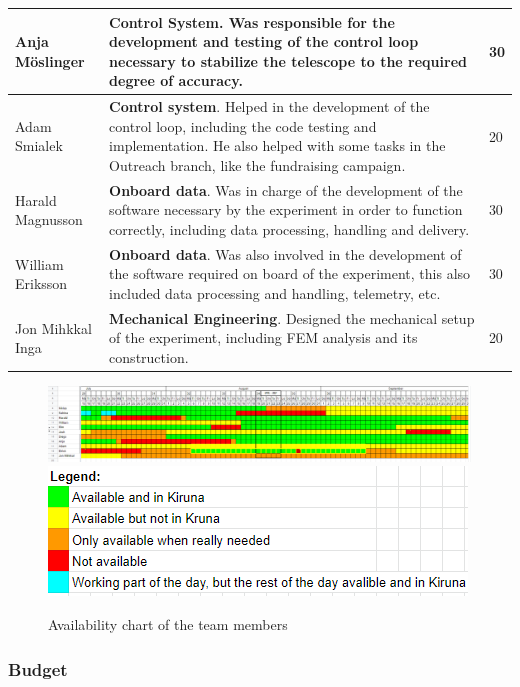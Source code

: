 \begin{longtable}{m{} | m{} | m{}}
	Anja M{\"o}slinger & \textbf{Control System}. Was responsible for the development and testing of the control loop necessary to stabilize the telescope to the required degree of accuracy. & 30 \\ \hline
	Adam Smialek & \textbf{Control system}.  Helped in the development of the control loop, including the code testing and implementation. He also helped with some tasks in the Outreach branch, like the fundraising campaign. & 20 \\ \hline
	Harald Magnusson & \textbf{Onboard data}. Was in charge of the development of the software necessary by the experiment in order to function correctly, including data processing, handling and delivery. & 30 \\ \hline
	William Eriksson & \textbf{Onboard data}. Was also involved in the development of the software required on board of the experiment, this also included data processing and handling, telemetry, etc. & 30 \\ \hline
	Jon Mihkkal Inga & \textbf{Mechanical Engineering}. Designed the mechanical setup of the experiment, including FEM analysis and its construction. & 20 \\ \hline

\end{longtable}

\newpage
\begin{landscape}
	\begin{figure}[H]
		\includegraphics[scale=1.2]{3-project-planning/img/availability.png}
		\includegraphics[scale=1.2]{3-project-planning/img/Availability_legend.png}
		\caption{Availability chart of the team members}
	\end{figure}
\end{landscape}

\newpage
\subsubsection{Budget}
\label{sec:3.2.2}

